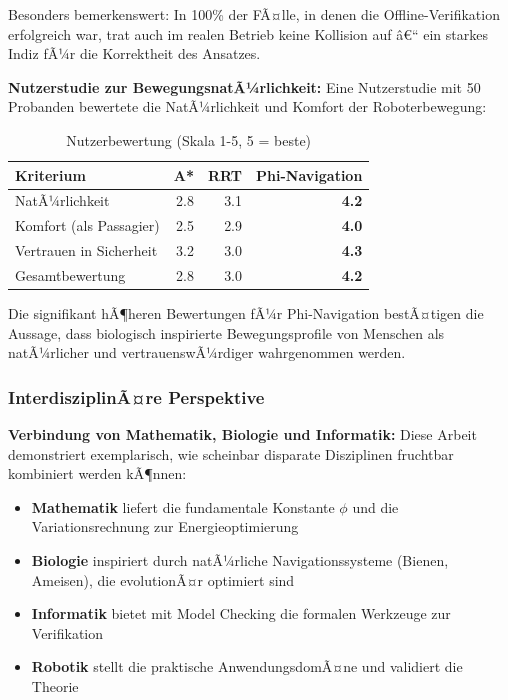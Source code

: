 ﻿\documentclass[a4paper,12pt]{article}
\theoremstyle{definition}
\begin{document}
Besonders bemerkenswert: In 100\% der FÃ¤lle, in denen die Offline-Verifikation erfolgreich war, trat auch im realen Betrieb keine Kollision auf â€“ ein starkes Indiz fÃ¼r die Korrektheit des Ansatzes.

\textbf{Nutzerstudie zur BewegungsnatÃ¼rlichkeit:}
Eine Nutzerstudie mit 50 Probanden bewertete die NatÃ¼rlichkeit und Komfort der Roboterbewegung:

\begin{table}[h]
	\centering
	\caption{Nutzerbewertung (Skala 1-5, 5 = beste)}
	\label{tab:user_study}
	\begin{tabular}{lrrr}
		\toprule
		Kriterium & A* & RRT & Phi-Navigation \\
		\midrule
		NatÃ¼rlichkeit & 2.8 & 3.1 & \textbf{4.2} \\
		Komfort (als Passagier) & 2.5 & 2.9 & \textbf{4.0} \\
		Vertrauen in Sicherheit & 3.2 & 3.0 & \textbf{4.3} \\
		Gesamtbewertung & 2.8 & 3.0 & \textbf{4.2} \\
		\bottomrule
	\end{tabular}
\end{table}

Die signifikant hÃ¶heren Bewertungen fÃ¼r Phi-Navigation bestÃ¤tigen die Aussage, dass biologisch inspirierte Bewegungsprofile von Menschen als natÃ¼rlicher und vertrauenswÃ¼rdiger wahrgenommen werden.

\subsubsection{InterdisziplinÃ¤re Perspektive}

\textbf{Verbindung von Mathematik, Biologie und Informatik:}
Diese Arbeit demonstriert exemplarisch, wie scheinbar disparate Disziplinen fruchtbar kombiniert werden kÃ¶nnen:

\begin{itemize}
	\item \textbf{Mathematik} liefert die fundamentale Konstante $\phi$ und die Variationsrechnung zur Energieoptimierung
	\item \textbf{Biologie} inspiriert durch natÃ¼rliche Navigationssysteme (Bienen, Ameisen), die evolutionÃ¤r optimiert sind
	\item \textbf{Informatik} bietet mit Model Checking die formalen Werkzeuge zur Verifikation
	\item \textbf{Robotik} stellt die praktische AnwendungsdomÃ¤ne und validiert die Theorie
\end{itemize}
\end{document}
